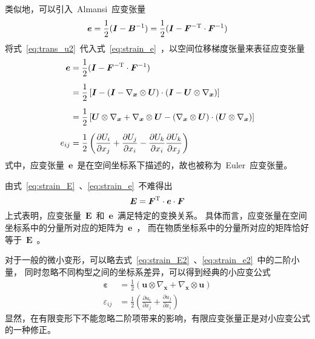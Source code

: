 类似地，可以引入~Almansi~应变张量
\begin{equation}\label{eq:strain_e}
	\bm{e}=\frac{1}{2}(\bm{I}-\bm{B}^{-1})=\frac{1}{2}(\bm{I}-\bm{F}^{-\mathrm{T}} \cdot \bm{F}^{-1})
\end{equation}
将式~\eqref{eq:trans_u2}~代入式~\eqref{eq:strain_e}~，以空间位移梯度张量来表征应变张量
{\setlength\belowdisplayskip{5pt}
\begin{subequations}\label{eq:strain_e2}
	\begin{align}
	\bm{e}  & =\frac{1}{2}(\bm{I}-\bm{F}^{-\mathrm{T}} \cdot \bm{F}^{-1}) \notag \\[5pt]
			& =\frac{1}{2}\left[\bm{I} - (\bm{I}-\nabla_{\bm{x}} \otimes \bm{U}) \cdot (\bm{I}-\bm{U} \otimes \nabla_{\bm{x}}) \right] \\[5pt]
			& =\frac{1}{2}\left[\bm{U} \otimes \nabla_{\bm{x}} + \nabla_{\bm{x}} \otimes \bm{U} - (\nabla_{\bm{x}} \otimes \bm{U}) \cdot (\bm{U} \otimes \nabla_{\bm{x}}) \right] \notag \\[5pt]
	e_{ij}  & =\frac{1}{2} \left( \frac{\partial U_i}{\partial x_j} + \frac{\partial U_j}{\partial x_i} - \frac{\partial U_k}{\partial x_i} \frac{\partial U_k}{\partial x_j}\right) \label{eq:strain_e3}
	\end{align}
\end{subequations}}
式中，应变张量~$\bm{e}$~是在空间坐标系下描述的，故也被称为~Euler~应变张量。

由式~\eqref{eq:strain_E}~、\eqref{eq:strain_e}~不难得出
\begin{equation}\label{eq:trans_E_e}
	\bm{E}=\bm{F}^{\mathrm{T}} \cdot \bm{e} \cdot \bm{F}
\end{equation}
上式表明，应变张量~$\bm{E}$~和~$\bm{e}$~满足特定的变换关系。
具体而言，应变张量在空间坐标系中的分量所对应的矩阵为~$\bm{e}$~，
而在物质坐标系中的分量所对应的矩阵恰好等于~$\bm{E}$~。

对于一般的微小变形，可以略去式~\eqref{eq:strain_E2}~、\eqref{eq:strain_e2}~中的二阶小量，
同时忽略不同构型之间的坐标系差异，可以得到经典的小应变公式
{\setlength\belowdisplayskip{5pt}
\begin{subequations}
	\begin{align}
	\bm{\varepsilon} & = \frac{1}{2}\left(\bm{u} \otimes \nabla_{\bm{x}} + \nabla_{\bm{x}} \otimes \bm{u} \right) \\[5pt]
	\varepsilon_{ij} & = \frac{1}{2}\left(\frac{\partial u_i}{\partial x_j} + \frac{\partial u_j}{\partial x_i} \right)
	\end{align}
\end{subequations}}
显然，在有限变形下不能忽略二阶项带来的影响，有限应变张量正是对小应变公式的一种修正。

